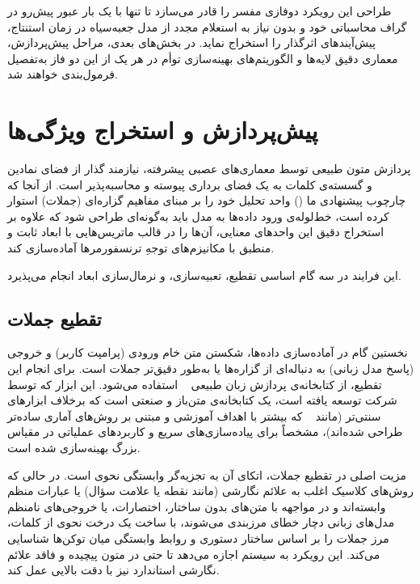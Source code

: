 طراحی این رویکرد دوفازی مفسر را قادر می‌سازد تا تنها با یک بار عبور پیش‌رو در گراف محاسباتی خود و بدون نیاز به استعلام مجدد از مدل جعبه‌سیاه در زمان استنتاج، پیش‌آیندهای اثرگذار را استخراج نماید. در بخش‌های بعدی، مراحل پیش‌پردازش، معماری دقیق لایه‌ها و الگوریتم‌های بهینه‌سازی توأم در هر یک از این دو فاز به‌تفصیل فرمول‌بندی خواهند شد.



\section{پیش‌پردازش و استخراج ویژگی‌ها}\label{sec:4-2}

پردازش متون طبیعی توسط معماری‌های عصبی پیشرفته، نیازمند گذار از فضای نمادین و گسسته‌ی کلمات به یک فضای برداری پیوسته و محاسبه‌پذیر است. از آنجا که چارچوب پیشنهادی ما () واحد تحلیل خود را بر مبنای مفاهیم گزاره‌ای (جملات) استوار کرده است، خط‌لوله‌ی ورود داده‌ها به مدل باید به‌گونه‌ای طراحی شود که علاوه بر استخراج دقیق این واحدهای معنایی، آن‌ها را در قالب ماتریس‌هایی با ابعاد ثابت و منطبق با مکانیزم‌های توجهِ ترنسفورمرها آماده‌سازی کند.

این فرایند در سه گام اساسی تقطیع، تعبیه‌سازی، و نرمال‌سازی ابعاد انجام می‌پذیرد.


\subsection{تقطیع جملات}\label{sec:4-2-1}

نخستین گام در آماده‌سازی داده‌ها، شکستن متن خام ورودی (پرامپت کاربر) و خروجی (پاسخ مدل زبانی) به دنباله‌ای از گزاره‌ها یا به‌طور دقیق‌تر جملات است. برای انجام این تقطیع، از کتابخانه‌ی پردازش زبان طبیعی ~\cite{honnibal2017spacy} استفاده می‌شود. این ابزار که توسط شرکت  توسعه یافته است، یک کتابخانه‌ی متن‌باز و صنعتی است که برخلاف ابزارهای سنتی‌تر (مانند ~\cite{loper2002nltk} که بیشتر با اهداف آموزشی و مبتنی بر روش‌های آماری ساده‌تر طراحی شده‌اند)، مشخصاً برای پیاده‌سازی‌های سریع و کاربردهای عملیاتی در مقیاس بزرگ بهینه‌سازی شده است.

مزیت اصلی  در تقطیع جملات، اتکای آن به تجزیه‌گر وابستگی نحوی است. در حالی که روش‌های کلاسیک اغلب به علائم نگارشی (مانند نقطه یا علامت سؤال) یا عبارات منظم وابسته‌اند و در مواجهه با متن‌های بدون ساختار، اختصارات، یا خروجی‌های نامنظم مدل‌های زبانی دچار خطای مرزبندی می‌شوند،  با ساخت یک درخت نحوی از کلمات، مرز جملات را بر اساس ساختار دستوری و روابط وابستگی میان توکن‌ها شناسایی می‌کند. این رویکرد به سیستم اجازه می‌دهد تا حتی در متون پیچیده و فاقد علائم نگارشی استاندارد نیز با دقت بالایی عمل کند.

